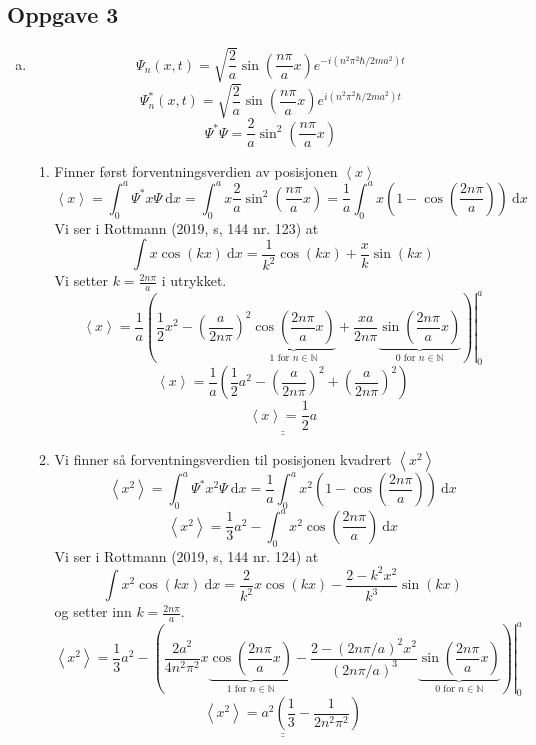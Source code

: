 \documentclass{article}
\begin{document}
\subsection*{Oppgave 3}
\begin{enumerate}[a)]
    \item 
    \[
    Ψ_n(x,t) = \sqrt{\frac{2}{a}} \sin \left(\frac{nπ}{a}x\right)e^{-i \left(n^2π^2ℏ / 2ma^2\right)t}
    \]
    \[
    Ψ_n^{*}(x,t) = \sqrt{\frac{2}{a}} \sin \left(\frac{nπ}{a}x\right)e^{i \left(n^2π^2ℏ / 2ma^2\right)t}
    \]
    \[
    Ψ^{*}Ψ = \frac{2}{a} \sin^2 \left(\frac{nπ}{a}x\right) 
    \]
    
    \begin{enumerate}[\bf I.]
    \item 
    Finner først forventningsverdien av posisjonen $\left<x\right>$
    \[
    \left<x\right> = ∫_{0}^{a} Ψ^{*}xΨ \ \mathrm{d}x = ∫_{0}^{a} x \frac{2}{a} \sin^2 \left(\frac{nπ}{a}x\right) = \frac{1}{a} ∫_{0}^{a} x\left(1 - \cos \left(\frac{2nπ}{a}\right)\right) \ \mathrm{d}x
    \]
    Vi ser i Rottmann (2019, s, 144 nr. 123) at
    \[
    ∫ x \cos \left(kx\right) \ \mathrm{d}x = \frac{1}{k^2} \cos (kx) + \frac{x}{k} \sin (kx)
    \]
    Vi setter $\displaystyle k = \frac{2nπ}{a}$ i utrykket. 
    \[
   \left<x\right> = \frac{1}{a} \left( \frac{1}{2}x^2 - \left. \left(\frac{a}{2nπ}\right)^2 \underbrace{\cos \left(\frac{2nπ}{a}x\right)}_{1 \text{ for } n ∈ \mathbb{N}} + \frac{xa}{2nπ} \underbrace{\sin \left(\frac{2nπ}{a}x\right)}_{0 \text{ for } n ∈ \mathbb{N}}\right)\right\rvert_{0}^{a}
    \]
    \[
    \left<x\right> = \frac{1}{a}\left(\frac{1}{2}a^2 - \left(\frac{a}{2nπ}\right)^2 + \left(\frac{a}{2nπ}\right)^2\right)
    \]
    \[
    \underline{\underline{\left<x\right> = \frac{1}{2}a}}
    \]
    
    \item  
    Vi finner så forventningsverdien til posisjonen kvadrert $\left<x^2\right>$    
    \[
    \left<x^2\right> = ∫_{0}^{a} Ψ^{*}x^2Ψ \ \mathrm{d}x =\frac{1}{a} ∫_{0}^{a} x^2\left(1 - \cos \left(\frac{2nπ}{a}\right)\right) \ \mathrm{d}x
    \]
    \[
    \left<x^2\right> = \frac{1}{3}a^2 - ∫_{0}^{a} x^2 \cos \left(\frac{2nπ}{a}\right) \ \mathrm{d}x
    \]
    Vi ser i Rottmann (2019, s, 144 nr. 124) at
    \[
    ∫ x^2 \cos \left(kx\right) \ \mathrm{d}x = \frac{2}{k^2}x \cos (kx) -  \frac{2 - k^2x^2}{k^3} \sin (kx)
    \]
    og setter inn $\displaystyle k = \frac{2nπ}{a}$. 
    \[
    \left<x^2\right> = \frac{1}{3}a^2 - \left(\left.\frac{2a^2}{4n^2π^2}x \underbrace{\cos \left(\frac{2nπ}{a}x\right)}_{1 \text{ for } n ∈ \mathbb{N}} - \frac{2 - (2nπ / a)^2 x^2}{(2nπ / a)^{3}} \underbrace{\sin \left(\frac{2nπ}{a}x\right)}_{0 \text{ for } n ∈ \mathbb{N}}\right)\right\rvert_{0}^{a}
    \]
    \[
    \underline{\underline{\left<x^2\right> = a^2 \left(\frac{1}{3} - \frac{1}{2n^2π^2}\right)}}
    \] 
    

\end{enumerate}
\end{enumerate}
\end{document}
